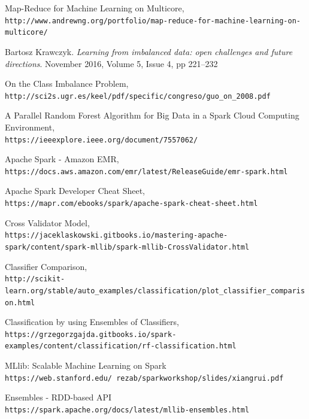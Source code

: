 \documentclass{neu_handout}
\begin{document}
\newpage

\begin{thebibliography}{9}

Map-Reduce for Machine Learning on Multicore,
\\\texttt{http://www.andrewng.org/portfolio/map-reduce-for-machine-learning-on-multicore/}

 Bartosz Krawczyk. \textsl{Learning from imbalanced data: open challenges and future directions}. November 2016, Volume 5, Issue 4, pp 221–232

On the Class Imbalance Problem,
\\\texttt{http://sci2s.ugr.es/keel/pdf/specific/congreso/guo\_on\_2008.pdf}

A Parallel Random Forest Algorithm for Big Data in a Spark Cloud Computing Environment,
\\\texttt{https://ieeexplore.ieee.org/document/7557062/}

Apache Spark - Amazon EMR,
\\\texttt{https://docs.aws.amazon.com/emr/latest/ReleaseGuide/emr-spark.html}

Apache Spark Developer Cheat Sheet,
\\\texttt{https://mapr.com/ebooks/spark/apache-spark-cheat-sheet.html}

Cross Validator Model,
\\\texttt{https://jaceklaskowski.gitbooks.io/mastering-apache-spark/content/spark-mllib/spark-mllib-CrossValidator.html}

Classifier Comparison,
\\\texttt{http://scikit-learn.org/stable/auto\_examples/classification/plot\_classifier\_comparison.html}

Classification by using Ensembles of Classifiers,
\\\texttt{https://grzegorzgajda.gitbooks.io/spark-examples/content/classification/rf-classification.html}


MLlib: Scalable Machine Learning on Spark
\\\texttt{https://web.stanford.edu/~rezab/sparkworkshop/slides/xiangrui.pdf}


Ensembles - RDD-based API
\\\texttt{https://spark.apache.org/docs/latest/mllib-ensembles.html}


\end{thebibliography}
\end{document}

